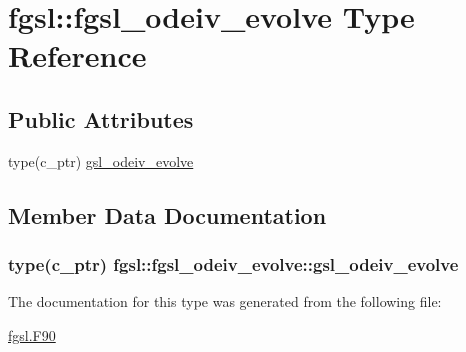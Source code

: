 \hypertarget{structfgsl_1_1fgsl__odeiv__evolve}{}\section{fgsl\+:\+:fgsl\+\_\+odeiv\+\_\+evolve Type Reference}
\label{structfgsl_1_1fgsl__odeiv__evolve}
\subsection*{Public Attributes}
\begin{DoxyCompactItemize}
\item 
type(c\+\_\+ptr) \hyperlink{structfgsl_1_1fgsl__odeiv__evolve_aa53db1afa78765924e2ee9be04dab5e9}{gsl\+\_\+odeiv\+\_\+evolve}
\end{DoxyCompactItemize}


\subsection{Member Data Documentation}
\hypertarget{structfgsl_1_1fgsl__odeiv__evolve_aa53db1afa78765924e2ee9be04dab5e9}{}
\subsubsection[{gsl\+\_\+odeiv\+\_\+evolve}]{\setlength{\rightskip}{0pt plus 5cm}type(c\+\_\+ptr) fgsl\+::fgsl\+\_\+odeiv\+\_\+evolve\+::gsl\+\_\+odeiv\+\_\+evolve}\label{structfgsl_1_1fgsl__odeiv__evolve_aa53db1afa78765924e2ee9be04dab5e9}


The documentation for this type was generated from the following file\+:\begin{DoxyCompactItemize}
\item 
\hyperlink{fgsl_8F90}{fgsl.\+F90}\end{DoxyCompactItemize}
